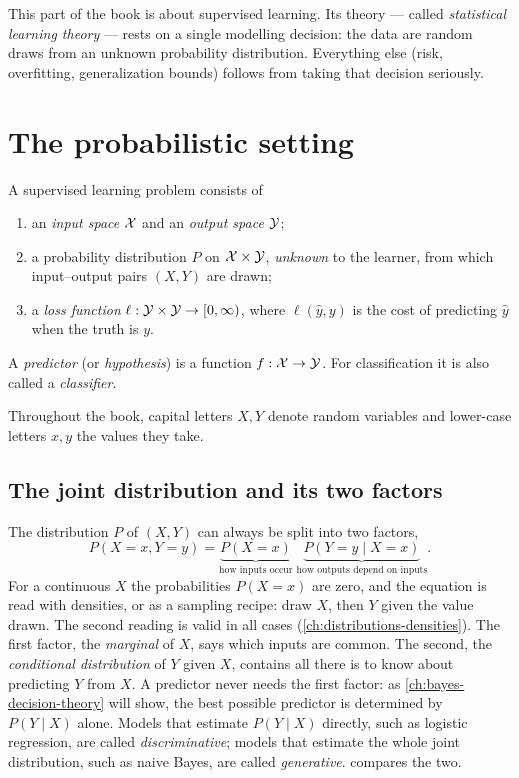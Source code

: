 \begin{notechapter}
This part of the book is about supervised learning. Its theory --- called
\emph{statistical learning theory} --- rests on a single modelling decision:
the data are random draws from an unknown probability distribution. Everything
else (risk, overfitting, generalization bounds) follows from taking that
decision seriously.

\section{The probabilistic setting}\label{learning-problem:sec:setting}

\begin{definition}\label{learning-problem:def:problem}
A supervised learning problem consists of
\begin{enumerate}[nosep]
  \item an \emph{input space} $\mathcal{X}$ and an \emph{output space} $\mathcal{Y}$;
  \item a probability distribution $P$ on $\mathcal{X} \times \mathcal{Y}$, \emph{unknown} to
        the learner, from which input--output pairs $(X, Y)$ are drawn;
  \item a \emph{loss function} $\ell : \mathcal{Y} \times \mathcal{Y} \to [0, \infty)$, where
        $\ell(\hat y, y)$ is the cost of predicting $\hat y$ when the truth is
        $y$.
\end{enumerate}
A \emph{predictor} (or \emph{hypothesis}) is a function $f : \mathcal{X} \to \mathcal{Y}$. For
classification it is also called a \emph{classifier}.
\end{definition}

Throughout the book, capital letters $X, Y$ denote random variables and
lower-case letters $x, y$ the values they take.

\subsection{The joint distribution and its two factors}

The distribution $P$ of $(X,Y)$ can always be split into two factors,
\begin{equation}\label{learning-problem:eq:factorization}
  P(X = x, Y = y) = \underbrace{P(X = x)}_{\text{how inputs occur}}
  \;\underbrace{P(Y = y \mid X = x)}_{\text{how outputs depend on inputs}} .
\end{equation}
For a continuous $X$ the probabilities $P(X = x)$ are zero, and the equation is read with densities, or
as a sampling recipe: draw $X$, then $Y$ given the value drawn. The second reading is valid in all cases
(\cref{ch:distributions-densities}).
The first factor, the \emph{marginal} of $X$, says which inputs are common.
The second, the \emph{conditional distribution} of $Y$ given $X$, contains all
there is to know about predicting $Y$ from $X$. A predictor never needs the
first factor: as \cref{ch:bayes-decision-theory} will show, the best possible
predictor is determined by $P(Y \mid X)$ alone. Models that estimate
$P(Y\mid X)$ directly, such as logistic regression, are called
\emph{discriminative}; models that estimate the whole joint distribution, such
as naive Bayes, are called \emph{generative}. 
compares the two.


\end{notechapter}
